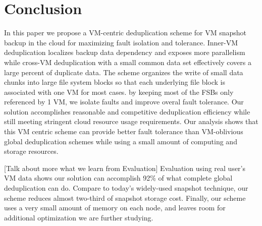 \section{Conclusion}
\label{sect:final}
In this paper we propose a VM-centric deduplication scheme for 
VM snapshot backup in the cloud for maximizing fault isolation and tolerance. 
Inner-VM deduplication localizes backup data dependency and exposes more parallelism  
while cross-VM deduplication with a small common data set
effectively  covers a large percent of duplicate data.
The scheme organizes the write of small data chunks into large file system blocks so
that each underlying file block is associated with one VM for most cases.
by keeping most of the FSBs only referenced by 1 VM, we isolate faults and improve overal fault tolerance.
Our solution accomplishes reasonable and competitive deduplication efficiency while
still meeting stringent cloud resource usage requirements. 
Our analysis shows that  this VM centric scheme 
can  provide  better fault tolerance than VM-oblivious global deduplication schemes
while using a small amount of computing and storage resources. 


[Talk about more what we learn from Evaluation]
Evaluation using real user's VM data shows
our solution can accomplish 92\% of what complete global
deduplication can do. 
Compare to today's widely-used snapshot technique, our scheme reduces almost
two-third of snapshot storage cost.
Finally, our scheme uses a very small amount of memory on each node, and leaves
room for additional optimization we are further studying.




 
